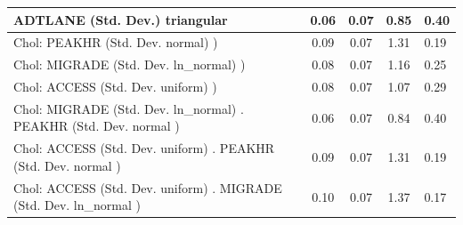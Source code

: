 \begin{table}
\begin{center}
\begin{tabular}{|l|l|c|c|c|l|}
			\hline
			ADTLANE (Std. Dev.) triangular &  & 0.06 & 0.07 & 0.85 & 0.40 \\
			\hline
			 Chol: PEAKHR (Std. Dev. normal) ) &  & 0.09 & 0.07 & 1.31 & 0.19 \\
			\hline
			 Chol: MIGRADE (Std. Dev. ln_normal) ) &  & 0.08 & 0.07 & 1.16 & 0.25 \\
			\hline
			 Chol: ACCESS (Std. Dev. uniform) ) &  & 0.08 & 0.07 & 1.07 & 0.29 \\
			\hline
			 Chol: MIGRADE (Std. Dev. ln_normal) . PEAKHR (Std. Dev.   normal ) &  & 0.06 & 0.07 & 0.84 & 0.40 \\
			\hline
			 Chol: ACCESS (Std. Dev. uniform) . PEAKHR (Std. Dev.   normal ) &  & 0.09 & 0.07 & 1.31 & 0.19 \\
			\hline
			 Chol: ACCESS (Std. Dev. uniform) . MIGRADE (Std. Dev.   ln_normal ) &  & 0.10 & 0.07 & 1.37 & 0.17 \\
			\hline
		\end{tabular}
	\end{center}
\end{table}